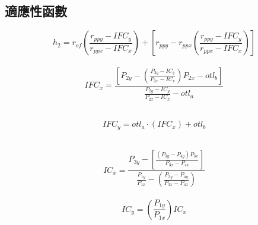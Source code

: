 \documentclass[14pt,a4paper]{report}  %
\newcommand{\fourteen}{\fontsize{14pt}{\baselineskip}\selectfont}%
\begin{document}
      \subsection{適應性函數}
	  \quad \fourteen {機構合成設計需求為騎乘姿勢改變時或遇到顛頗不整的路時仍能保持整體的平衡，即Anti-squat及Anti-rise的數值能在100\%附近，而上述合成需求之適應函數可表示為}      
      
      \begin{equation}
      h_{2} = r_{of}\left (\frac{r_{ppy}-IFC_{y}}{r_{ppx}-IFC_{x}}\right ) + \left[ r_{ppy}-r_{ppx}\left( \frac{r_{ppy}-IFC_{y}}{r_{ppx}-IFC_{x}} \right) \right]
      \end{equation}  
      \hspace*{\fill} \\
      
      \fourteen {其中}
      \begin{equation}
      IFC_{x} = \frac{\left[ P_{2y} - \left( \frac{P_{2y} - IC_{y}}{P_{2x} - IC_{x}} \right )P_{2x} - otl_{b} \right ]}{\frac{P_{2y} - IC_{y}}{P_{2x} - IC_{x}}-otl_{a}}
      \end{equation}
      \hspace*{\fill} \\
      

      \begin{flushleft}
      \begin{equation}
      IFC_{y} = otl_{a} \cdot \left( IFC_{x} \right ) + otl_{b}
      \end{equation}
      \end{flushleft}
      \hspace*{\fill} \\
      
      \begin{equation}
      IC_{x} = \frac{P_{3y} - \left [ \frac {(P_{3y} - P_{4y})P_{3x}}{P_{3x}-P_{4x}} \right ]}{\frac{P_{1y}}{P_{1x}}-\left ( \frac{P_{3y} - P_{4y}}{P_{3x}-P_{4x}} \right )}
      \end{equation}
      \hspace*{\fill} \\
      
      \begin{equation}
      IC_{y} = \left ( \frac{P_{1y}}{P_{1x}} \right ) IC_{x}
      \end{equation}
      \hspace*{\fill} \\
      
\end{document}
